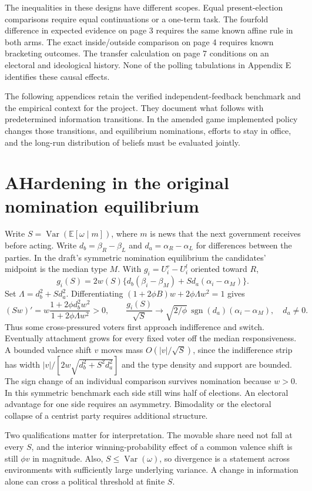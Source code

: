 \documentclass[11pt,letterpaper]{article}
\newcommand{\sect}[1]{\section*{\color{ink}#1}}
\newcommand{\E}{\mathbb E}
\newcommand{\Var}{\operatorname{Var}}
\begin{document}
The inequalities in these designs have different scopes. Equal present-election comparisons require equal continuations or a one-term task. The fourfold difference in expected evidence on page 3 requires the same known affine rule in both arms. The exact inside/outside comparison on page 4 requires known bracketing outcomes. The transfer calculation on page 7 conditions on an electoral and ideological history. None of the polling tabulations in Appendix E identifies these causal effects.

The following appendices retain the verified independent-feedback benchmark and the empirical context for the project. They document what follows with predetermined information transitions. In the amended game implemented policy changes those transitions, and equilibrium nominations, efforts to stay in office, and the long-run distribution of beliefs must be evaluated jointly.

\newpage
\sect{A\quad Hardening in the original nomination equilibrium}
Write $S=\Var(\E[\omega\mid m])$, where $m$ is news that the next government receives before acting. Write $d_b=\beta_R-\beta_L$ and $d_a=\alpha_R-\alpha_L$ for differences between the parties. In the draft's symmetric nomination equilibrium the candidates' midpoint is the median type $M$. With $g_i=U_i^r-U_i^l$ oriented toward $R$,
\begin{equation}
 g_i(S)=2w(S)\{d_b(\beta_i-\beta_M)+S d_a(\alpha_i-\alpha_M)\}.
\end{equation}
Set $\Lambda=d_b^2+Sd_a^2$. Differentiating $(1+2\phi B)w+2\phi\Lambda w^2=1$ gives
\[
 (Sw)'=w\frac{1+2\phi d_b^2 w^2}{1+2\phi\Lambda w^2}>0,
 \qquad
 \frac{g_i(S)}{\sqrt S}\longrightarrow
 \sqrt{2/\phi}\,\operatorname{sgn}(d_a)(\alpha_i-\alpha_M),\quad d_a\ne0.
\]
Thus some cross-pressured voters first approach indifference and switch. Eventually attachment grows for every fixed voter off the median responsiveness. A bounded valence shift $v$ moves mass $O(|v|/\sqrt S)$, since the indifference strip has width $|v|/[2w\sqrt{d_b^2+S^2d_a^2}]$ and the type density and support are bounded. The sign change of an individual comparison survives nomination because $w>0$. In this symmetric benchmark each side still wins half of elections. An electoral advantage for one side requires an asymmetry. Bimodality or the electoral collapse of a centrist party requires additional structure.

Two qualifications matter for interpretation. The movable share need not fall at every $S$, and the interior winning-probability effect of a common valence shift is still $\phi v$ in magnitude. Also, $S\leq\Var(\omega)$, so divergence is a statement across environments with sufficiently large underlying variance. A change in information alone can cross a political threshold at finite $S$.
\end{document}
